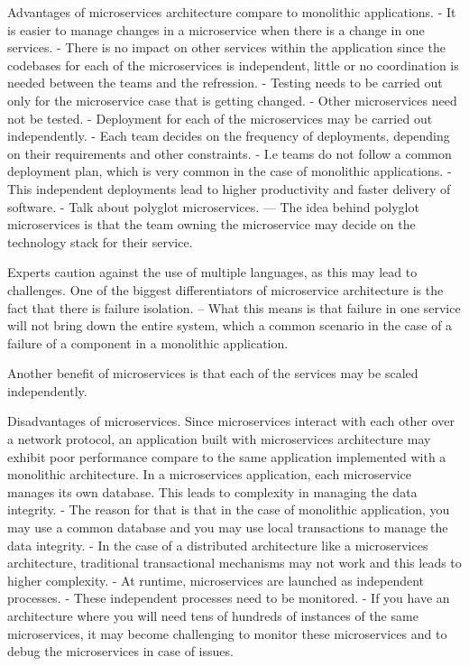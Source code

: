 \documentclass[a4paper, 11pt]{book}
\begin{document}
    Advantages of microservices architecture compare to monolithic applications.
    - It is easier to manage changes in a microservice when there is a change in one services.
    - There is no impact on other services within the application since the codebases for each of the microservices is independent, little or no coordination is needed between the teams and the refression.
    - Testing needs to be carried out only for the microservice case that is getting changed.
    - Other microservices need not be tested.
    - Deployment for each of the microservices may be carried out independently.
    - Each team decides on the frequency of deployments, depending on their requirements and other constraints.
    - I.e teams do not follow a common deployment plan, which is very common in the case of monolithic applications.
    - This independent deployments lead to higher productivity and faster delivery of software.
    - Talk about polyglot microservices.
    --- The idea behind polyglot microservices is that the team owning the microservice may decide on the technology stack for their service.

    Experts caution against the use of multiple languages, as this may lead to challenges.
    One of the biggest differentiators of microservice architecture is the fact that there is failure isolation.
    -- What this means is that failure in one service will not bring down the entire system, which a common scenario in the case of a failure of a component in a monolithic application.

    Another benefit of microservices is that each of the services may be scaled independently.

    Disadvantages of microservices.
    Since microservices interact with each other over a network protocol, an application built with microservices architecture may exhibit poor performance compare to the same application implemented with a monolithic architecture.
    In a microservices application, each microservice manages its own database.
    This leads to complexity in managing the data integrity.
    - The reason for that is that in the case of monolithic application, you may use a common database and you may use local transactions to manage the data integrity.
    - In the case of a distributed architecture like a microservices architecture, traditional transactional mechanisms may not work and this leads to higher complexity.
    - At runtime, microservices are launched as independent processes.
    - These independent processes need to be monitored.
    - If you have an architecture where you will need tens of hundreds of instances of the same microservices, it may become challenging to monitor these microservices and to debug the microservices in case of issues.
\end{document}
